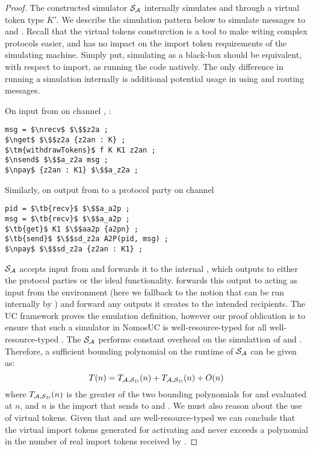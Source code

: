 \begin{proof}
The constructed simulator $\mathcal{S}_\mathcal{A}$ internally simulates \DS and \A through a virtual token type $K'$. 
We describe the simulation pattern below to simulate messages to \DS and \A.
Recall that the virtual tokens consturction is a tool to make witing complex protocols easier, and has no impact on the import token requirements of the simulating machine.
Simply put, simulating as a black-box should be equivalent, with respect to import, as \Sim running the code natively. 
The only difference in running a simulation internally is additional potential usage in using  and routing messages.

On input from \Z on channel , \Sim:
\begin{lstlisting}[basicstyle=\small\BeraMonottFamily, frame=single,  mathescape, label={lst:sim}]
msg = $\nrecv$ $\$$z2a ;
$\nget$ $\$$z2a {z2an : K} ;
$\tm{withdrawTokens}$ f K K1 z2an ;
$\nsend$ $\$$a_z2a msg ;
$\npay$ {z2an : K1} $\$$a_z2a ; 
\end{lstlisting}

Similarly, on output from \A to a protocol party on channel 
\begin{lstlisting}[basicstyle=\small\BeraMonottFamily, frame=single,  mathescape]
pid = $\tb{recv}$ $\$$a_a2p ;
msg = $\tb{recv}$ $\$$a_a2p ;
$\tb{get}$ K1 $\$$aa2p {a2pn} ;
$\tb{send}$ $\$$sd_z2a A2P(pid, msg) ;
$\npay$ $\$$sd_z2a {z2an : K1} ;
\end{lstlisting}

$\mathcal{S}_\mathcal{A}$ accepts input from \Z and forwards it to the internal \A, which outputs to either the protocol parties or the ideal functionality. 
\Sim forwards this output to \DS acting as input from the environment (here we fallback to the notion that \A can be run internally by \Z) and forward any outputs it creates to the intended recipients.
The UC framework proves the emulation definition, however our proof oblication is to ensure that such a simulator in NomosUC is well-resource-typed for all well-resource-typed \A.
The $\mathcal{S}_\mathcal{A}$ performs constant overhead on the simulattion of \A and \DS. Therefore, a sufficient bounding polynomial on the runtime of $\mathcal{S}_\mathcal{A}$ can be given as:
\[
T(n) = T_{\mathcal{A},\mathcal{S}_{D}}(n) + T_{\mathcal{A},\mathcal{S}_{D}}(n) + O(n)
\]
where $T_{\mathcal{A},\mathcal{S}_{D}}(n)$ is the greater of the two bounding polynomials for \DS and \A evaluated at $n$, and $n$ is the import that \Z sends to \A and \Sim. 
We must also reason about the use of virtual tokens.
Given that \A and \DS are well-resource-typed we can conclude that the virtual import tokens generated for activating \A and \DS never exceeds a polynomial in the number of real import tokens received by \Sim. 
\end{proof}

